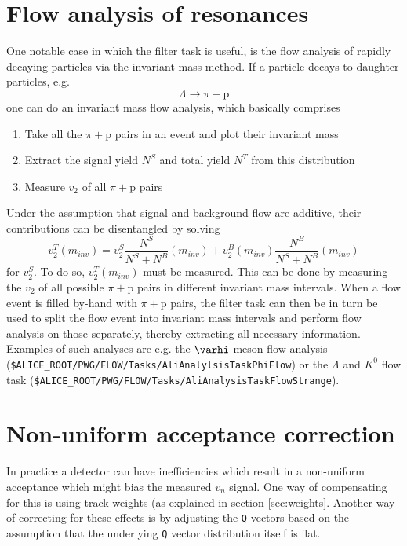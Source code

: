 \documentclass[a4paper]{book}
\numberwithin{equation}{subsection}
\begin{document}
\section{Flow analysis of resonances}
One notable case in which the filter task is useful, is the flow analysis of rapidly decaying particles via the invariant mass method. If a particle decays to daughter particles, e.g.
\begin{equation}
\Lambda \longrightarrow \pi + \mbox{p}
\end{equation}
one can do an invariant mass flow analysis, which basically comprises
\begin{enumerate}
\item Take all the $\pi + \mbox{p}$ pairs in an event and plot their invariant mass
\item Extract the signal yield \alert{$N^S$} and total yield \alert{$N^T$} from this distribution
\item Measure $v_2$ of all $\pi + \mbox{p}$ pairs
\end{enumerate}
Under the assumption that signal and background flow are additive, their contributions can be disentangled by solving
\begin{equation}
v_2^{T}(m_{inv})  = v_2^{S} \frac{N^{S} }{N^{S} + N^{B}}(m_{inv})  + v_2^{B}(m_{inv}) \frac{ N^{B}}{N^{S} + N^{B}}(m_{inv})
\end{equation}
for $v_2^{S}$. To do so, $v_2^{T}(m_{inv})$ must be measured. This can be done by measuring the $v_2$ of all possible $\pi + \mbox{p}$ pairs in different invariant mass intervals. When a flow event is filled by-hand with $\pi + \mbox{p}$ pairs, the filter task can then be in turn be used to split the flow event into invariant mass intervals and perform flow analysis on those separately, thereby extracting all necessary information. Examples of such analyses are e.g. the $\varhi$-meson flow analysis (\texttt{\$ALICE\_ROOT/PWG/FLOW/Tasks/AliAnalylsisTaskPhiFlow}) or the $\Lambda$ and $K^0$ flow task (\texttt{\$ALICE\_ROOT/PWG/FLOW/Tasks/AliAnalysisTaskFlowStrange}).

\section{Non-uniform acceptance correction}  
In practice a detector can have inefficiencies which result in a non-uniform acceptance which might bias the measured $v_n$ signal. One way of compensating for this is using track weights (as explained in section \ref{sec:weights}. Another way of correcting for these effects is by adjusting the \texttt{Q} vectors based on the assumption that the underlying \texttt{Q} vector distribution itself is flat. 
\end{document}
